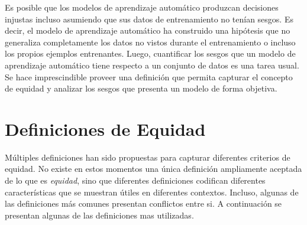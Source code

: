 Es posible que los modelos de aprendizaje automático produzcan decisiones injustas incluso asumiendo que sus datos de entrenamiento no tenían sesgos.
Es decir, el modelo de aprendizaje automático ha construido una hipótesis que no generaliza completamente los datos no vistos durante el entrenamiento o incluso los propios ejemplos entrenantes.
Luego, cuantificar los sesgos que un modelo de aprendizaje automático tiene respecto a un conjunto de datos es una tarea usual.
Se hace imprescindible proveer una definición que permita capturar el concepto de equidad y analizar los sesgos que presenta un modelo de forma objetiva.

\section{Definiciones de Equidad}

Múltiples definiciones han sido propuestas para capturar diferentes criterios de equidad.
No existe en estos momentos una única definición ampliamente aceptada de lo que es \textit{equidad}, sino que diferentes definiciones codifican diferentes características que se muestran útiles en diferentes contextos.
Incluso, algunas de las definiciones más comunes presentan conflictos entre si.
A continuación se presentan algunas de las definiciones mas utilizadas. 



